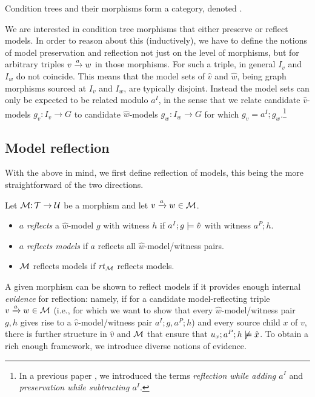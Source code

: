 \begin{proposition}
Condition trees and their morphisms form a category, denoted {\CT}.
\end{proposition}
%
We are interested in condition tree morphisms that either preserve or reflect models. In order to reason about this (inductively), we have to define the notions of model preservation and reflection not just on the level of morphisms, but for arbitrary triples ${v}\xrightarrow{a}{w}$ in those morphisms. For such a triple, in general $I_v$ and $I_w$ do not coincide. This means that the model sets of $\hat v$ and $\hat w$, being graph morphisms sourced at $I_v$ and $I_w$, are typically disjoint. Instead the model sets can only be expected to be related modulo $a^I$, in the sense that we relate candidate $\hat v$-models $g_v:I_v\to G$ to candidate $\hat w$-models $g_w:I_w\to G$ for which $g_v=a^I;g_w$.\footnote{In a previous paper \cite{RensCorr}, we introduced the terms \emph{reflection while adding $a^I$} and \emph{preservation while subtracting $a^I$}.}

\subsection{Model reflection}

With the above in mind, we first define reflection of models, this being the more straightforward of the two directions.

\begin{definition}
Let ${\mathcal{M}}{:}\, {\mathcal{T}}\rightarrow{\mathcal{U}}$ be a morphism and let ${v}\xrightarrow{a}{w}\in{\mathcal{M}}$.
\begin{itemize}
\item $a$ \emph{reflects} a $\hat w$-model $g$ with witness $h$ if $a^I;g\models \hat v$ with witness $a^P;h$.

\item $a$ \emph{reflects models} if $a$ reflects all $\hat w$-model/witness pairs.

\item ${\mathcal{M}}$ reflects models if $\mathit{rt}_{{\mathcal{M}}}$ reflects models.
\end{itemize}
\end{definition}
%
A given morphism can be shown to reflect models if it provides enough internal \emph{evidence} for reflection: namely, if for a candidate model-reflecting triple ${v}\xrightarrow{a}{w}\in {\mathcal{M}}$ (i.e., for which we want to show that every $\hat w$-model/witness pair $g,h$ gives rise to a $\hat v$-model/witness pair $a^I;g,a^P;h$) and every source child $x$ of $v$, there is further structure in $\hat v$ and ${\mathcal{M}}$ that ensure that $u_x;a^P;h\not\models \hat x$. To obtain a rich enough framework, we introduce diverse notions of evidence.

